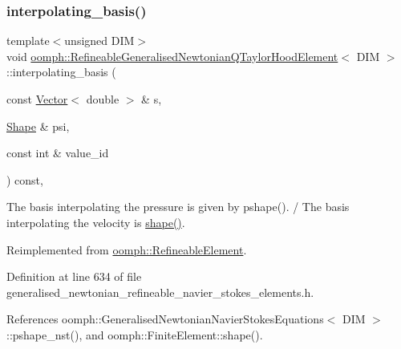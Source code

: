 \subsubsection{\texorpdfstring{interpolating\+\_\+basis()}{interpolating\_basis()}}
{\footnotesize\ttfamily template$<$unsigned D\+IM$>$ \\
void \hyperlink{classoomph_1_1RefineableGeneralisedNewtonianQTaylorHoodElement}{oomph\+::\+Refineable\+Generalised\+Newtonian\+Q\+Taylor\+Hood\+Element}$<$ D\+IM $>$\+::interpolating\+\_\+basis (\begin{DoxyParamCaption}\item[{const \hyperlink{classoomph_1_1Vector}{Vector}$<$ double $>$ \&}]{s,  }\item[{\hyperlink{classoomph_1_1Shape}{Shape} \&}]{psi,  }\item[{const int \&}]{value\+\_\+id }\end{DoxyParamCaption}) const\hspace{0.3cm}{\ttfamily [inline]}, {\ttfamily [virtual]}}



The basis interpolating the pressure is given by pshape(). / The basis interpolating the velocity is \hyperlink{classoomph_1_1FiniteElement_a58a25b6859ddd43b7bfe64a19fee5023}{shape()}. 



Reimplemented from \hyperlink{classoomph_1_1RefineableElement_a8ca420443c28708e5c6315a80f520137}{oomph\+::\+Refineable\+Element}.



Definition at line 634 of file generalised\+\_\+newtonian\+\_\+refineable\+\_\+navier\+\_\+stokes\+\_\+elements.\+h.



References oomph\+::\+Generalised\+Newtonian\+Navier\+Stokes\+Equations$<$ D\+I\+M $>$\+::pshape\+\_\+nst(), and oomph\+::\+Finite\+Element\+::shape().

\mbox{\label{classoomph_1_1RefineableGeneralisedNewtonianQTaylorHoodElement_a698043f19ce65cb9a8cc85bc816ccd7d}} 

